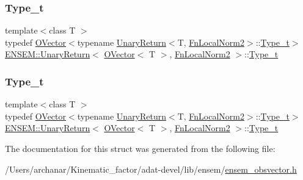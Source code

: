 \subsubsection{\texorpdfstring{Type\_t}{Type\_t}\hspace{0.1cm}{\footnotesize\ttfamily [2/3]}}
{\footnotesize\ttfamily template$<$class T $>$ \\
typedef \mbox{\hyperlink{classENSEM_1_1OVector}{O\+Vector}}$<$typename \mbox{\hyperlink{structENSEM_1_1UnaryReturn}{Unary\+Return}}$<$T, \mbox{\hyperlink{structENSEM_1_1FnLocalNorm2}{Fn\+Local\+Norm2}}$>$\+::\mbox{\hyperlink{structENSEM_1_1UnaryReturn_3_01OVector_3_01T_01_4_00_01FnLocalNorm2_01_4_ae6ea88d668b9a06249f8681572c8a7d4}{Type\+\_\+t}}$>$ \mbox{\hyperlink{structENSEM_1_1UnaryReturn}{E\+N\+S\+E\+M\+::\+Unary\+Return}}$<$ \mbox{\hyperlink{classENSEM_1_1OVector}{O\+Vector}}$<$ T $>$, \mbox{\hyperlink{structENSEM_1_1FnLocalNorm2}{Fn\+Local\+Norm2}} $>$\+::\mbox{\hyperlink{structENSEM_1_1UnaryReturn_3_01OVector_3_01T_01_4_00_01FnLocalNorm2_01_4_ae6ea88d668b9a06249f8681572c8a7d4}{Type\+\_\+t}}}

\mbox{\label{structENSEM_1_1UnaryReturn_3_01OVector_3_01T_01_4_00_01FnLocalNorm2_01_4_ae6ea88d668b9a06249f8681572c8a7d4}} 
\subsubsection{\texorpdfstring{Type\_t}{Type\_t}\hspace{0.1cm}{\footnotesize\ttfamily [3/3]}}
{\footnotesize\ttfamily template$<$class T $>$ \\
typedef \mbox{\hyperlink{classENSEM_1_1OVector}{O\+Vector}}$<$typename \mbox{\hyperlink{structENSEM_1_1UnaryReturn}{Unary\+Return}}$<$T, \mbox{\hyperlink{structENSEM_1_1FnLocalNorm2}{Fn\+Local\+Norm2}}$>$\+::\mbox{\hyperlink{structENSEM_1_1UnaryReturn_3_01OVector_3_01T_01_4_00_01FnLocalNorm2_01_4_ae6ea88d668b9a06249f8681572c8a7d4}{Type\+\_\+t}}$>$ \mbox{\hyperlink{structENSEM_1_1UnaryReturn}{E\+N\+S\+E\+M\+::\+Unary\+Return}}$<$ \mbox{\hyperlink{classENSEM_1_1OVector}{O\+Vector}}$<$ T $>$, \mbox{\hyperlink{structENSEM_1_1FnLocalNorm2}{Fn\+Local\+Norm2}} $>$\+::\mbox{\hyperlink{structENSEM_1_1UnaryReturn_3_01OVector_3_01T_01_4_00_01FnLocalNorm2_01_4_ae6ea88d668b9a06249f8681572c8a7d4}{Type\+\_\+t}}}



The documentation for this struct was generated from the following file\+:\begin{DoxyCompactItemize}
\item 
/\+Users/archanar/\+Kinematic\+\_\+factor/adat-\/devel/lib/ensem/\mbox{\hyperlink{adat-devel_2lib_2ensem_2ensem__obsvector_8h}{ensem\+\_\+obsvector.\+h}}\end{DoxyCompactItemize}
